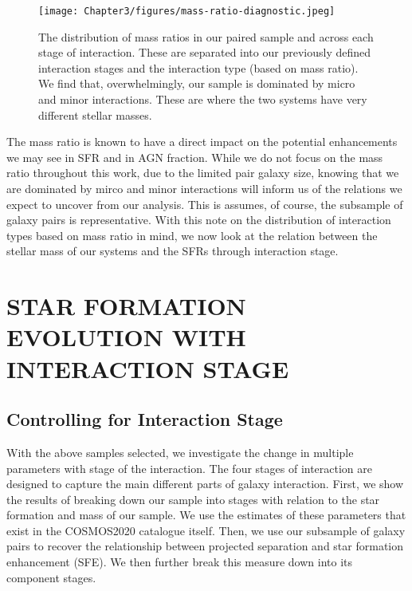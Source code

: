 \begin{figure}
    \centering
    \texttt{[image: Chapter3/figures/mass-ratio-diagnostic.jpeg]}
    \caption[The distribution of mass ratios in our paired sample and across each stage of interaction.]{The distribution of mass ratios in our paired sample and across each stage of interaction. These are separated into our previously defined interaction stages and the interaction type (based on mass ratio). We find that, overwhelmingly, our sample is dominated by micro and minor interactions. These are where the two systems have very different stellar masses.}
    \label{fig:proj-seps-limits}
\end{figure}

The mass ratio is known to have a direct impact on the potential enhancements we may see in SFR and in AGN fraction. While we do not focus on the mass ratio throughout this work, due to the limited pair galaxy size, knowing that we are dominated by mirco and minor interactions will inform us of the relations we expect to uncover from our analysis. This is assumes, of course, the subsample of galaxy pairs is representative. With this note on the distribution of interaction types based on mass ratio in mind, we now look at the relation between the stellar mass of our systems and the SFRs through interaction stage.


\section{STAR FORMATION EVOLUTION WITH INTERACTION STAGE}\label{results:SF_stage}
\subsection{Controlling for Interaction Stage}
\noindent With the above samples selected, we investigate the change in multiple parameters with stage of the interaction. The four stages of interaction are designed to capture the main different parts of galaxy interaction. First, we show the results of breaking down our sample into stages with relation to the star formation and mass of our sample. We use the estimates of these parameters that exist in the COSMOS2020 catalogue itself. Then, we use our subsample of galaxy pairs to recover the relationship between projected separation and star formation enhancement (SFE). We then further break this measure down into its component stages.

